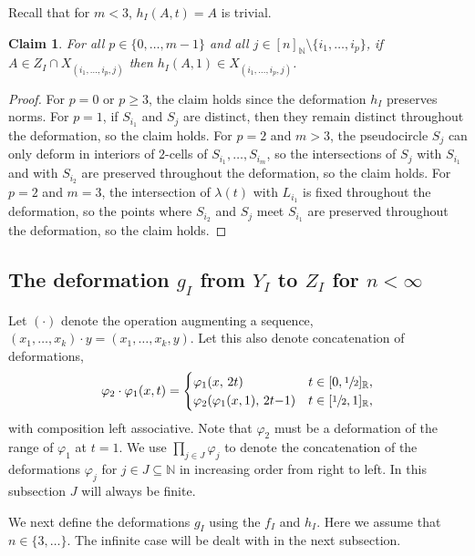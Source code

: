\documentclass[JEP,XML,SOM,Unicode,NoFloatCountersInSection,published]{cedram}
\let\nicefrac\sfrac
\newtheorem{claim}[theorem]{Claim}
\theoremstyle{remark}
\let\mb\mathbb
\let\phi\varphi
\begin{document}
Recall that for $m < 3$, $h_I(A,t) = A$ is trivial.

\begin{claim}\label{claim-stable-h}
For all $p \in \{0,\dots,m{-}1\}$ and all $j \in [n]_\mb{N} \setminus \{i_1,\dots,i_p\}$,
if $A \in Z_I \cap X_{(i_1,\dots,i_{p},j)}$ then $h_I(A,1) \in X_{(i_1,\dots,i_{p},j)}$.
\end{claim}

\begin{proof}
For $p = 0$ or $p \geq 3$, the claim holds since the deformation $h_I$ preserves norms.
For $p = 1$, if $S_{i_1}$ and $S_j$ are distinct, then they remain distinct throughout the deformation, so the claim holds.
For $p = 2$ and $m > 3$, the pseudocircle $S_j$ can only deform in interiors of $2$-cells of $S_{i_1},\dots,S_{i_m}$, so the intersections of $S_j$ with $S_{i_1}$ and with $S_{i_2}$ are preserved throughout the deformation, so the claim holds.
For $p = 2$ and $m = 3$, the intersection of $\lambda(t)$ with $L_{i_1}$ is fixed throughout the deformation, so the points where $S_{i_2}$ and $S_j$ meet $S_{i_1}$ are preserved throughout the deformation, so the claim holds.
\end{proof}

\subsection{The deformation $g_I$ from $Y_I$ to $Z_I$ for $n < \infty$}
\label{subsubsec-g-finite}

Let $(\cdot)$ denote the operation augmenting a sequence, $(x_1, \dots, x_k) \cdot y = (x_1, \dots, x_k, y)$.
Let this also denote concatenation of deformations,
\[\phi_2 \cdot \phi_1 (x,t) =
\begin{cases}
\phi_1(x,\, 2t) & t \in [0, \nicefrac{1}{2}]_\mb{R}, \\
\phi_2(\phi_1(x,1),\, 2t{-}1) & t \in [\nicefrac{1}{2},1]_\mb{R}, \\
\end{cases}
\]
with composition left associative. Note that $\phi_2$ must be a deformation of the range of $\phi_1$ at $t=1$.
We use $\prod_{j \in J} \phi_j$ to denote the concatenation of the deformations $\phi_j$ for $j \in J \subseteq \mb{N}$ in increasing order from right to left.
In this subsection $J$ will always be finite.

We next define the deformations $g_I$ using the $f_I$ and $h_I$.
Here we assume that $n \in \{3,\dots\}$. The infinite case will be dealt with in the next subsection.
\end{document}
